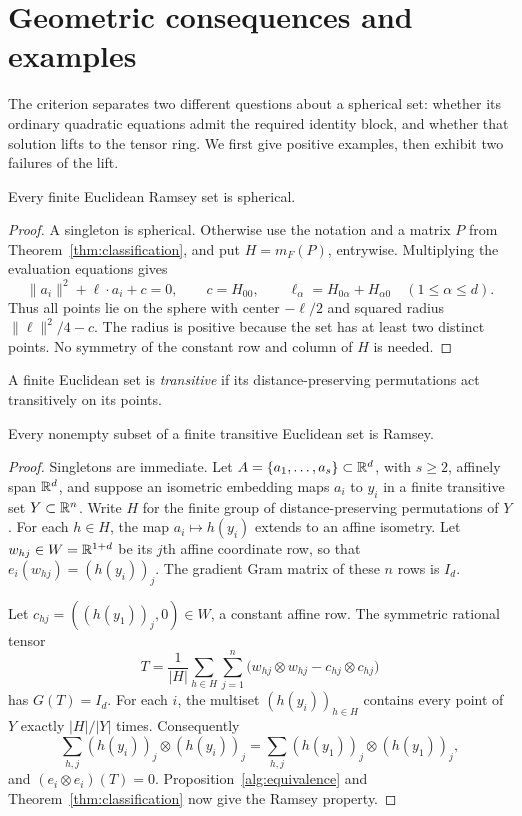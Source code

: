 \section{Geometric consequences and examples}\label{cons:section}\label{sec:consequences}

The criterion separates two different questions about a spherical set:
whether its ordinary quadratic equations admit the required identity
block, and whether that solution lifts to the tensor ring. We first give
positive examples, then exhibit two failures of the lift.

\begin{corollary}\label{cons:spherical}
Every finite Euclidean Ramsey set is spherical.
\end{corollary}
\begin{proof}
A singleton is spherical. Otherwise use the notation and a matrix $P$
from Theorem~\ref{thm:classification}, and put $H=m_F(P)$, entrywise.
Multiplying the evaluation equations gives
\[
 \|a_i\|^2+\ell\cdot a_i+c=0,
 \qquad c=H_{00},\qquad
 \ell_\alpha=H_{0\alpha}+H_{\alpha0}\quad(1\le\alpha\le d).
\]
Thus all points lie on the sphere with center $-\ell/2$ and squared
radius $\|\ell\|^2/4-c$. The radius is positive because the set has
at least two distinct points. No symmetry of the constant row and
column of $H$ is needed.
\end{proof}

A finite Euclidean set is \emph{transitive} if its distance-preserving
permutations act transitively on its points.

\begin{corollary}\label{cons:transitive}
Every nonempty subset of a finite transitive Euclidean set is Ramsey.
\end{corollary}
\begin{proof}
Singletons are immediate. Let $A=\{a_1,\ldots,a_s\}\subset\mathbb R^d$,
with $s\ge2$, affinely span $\mathbb R^d$, and suppose an isometric
embedding maps $a_i$ to $y_i$ in a finite transitive set
$Y\subset\mathbb R^n$. Write $H$ for the finite group of distance-preserving
permutations of $Y$. For each $h\in H$, the map $a_i\mapsto h(y_i)$
extends to an affine isometry. Let $w_{hj}\in W=\mathbb R^{1+d}$ be its
$j$th affine coordinate row, so that $e_i(w_{hj})=(h(y_i))_j$.
The gradient Gram matrix of these $n$ rows is $I_d$.

Let $c_{hj}=((h(y_1))_j,0)\in W$, a constant affine row. The
symmetric rational tensor
\[
 T=\frac1{|H|}\sum_{h\in H}\sum_{j=1}^n
       \bigl(w_{hj}\otimes w_{hj}-c_{hj}\otimes c_{hj}\bigr)
\]
has $G(T)=I_d$. For each $i$, the multiset $(h(y_i))_{h\in H}$
contains every point of $Y$ exactly $|H|/|Y|$ times. Consequently
\[
 \sum_{h,j}(h(y_i))_j\otimes(h(y_i))_j
 =\sum_{h,j}(h(y_1))_j\otimes(h(y_1))_j,
\]
and $(e_i\otimes e_i)(T)=0$. Proposition~\ref{alg:equivalence}
and Theorem~\ref{thm:classification} now give the Ramsey property.
\end{proof}

